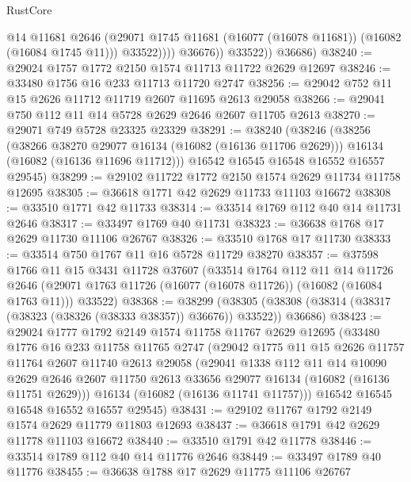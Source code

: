 \begin{lexlean}{RustCore}
\begin{coremodule}
                      @14
                      @11681
                      @2646
                      (@29071 @1745 @11681 (@16077 (@16078 @11681)) (@16082 (@16084 @1745 @11)))
                      @33522))))
              @36676))
          @33522))
      @36686)
@38240 := @29024 @1757 @1772 @2150 @1574 @11713 @11722 @2629 @12697
@38246 := @33480 @1756 @16 @233 @11713 @11720 @2747
@38256 := @29042 @752 @11 @15 @2626 @11712 @11719 @2607 @11695 @2613 @29058
@38266 := @29041 @750 @112 @11 @14 @5728 @2629 @2646 @2607 @11705 @2613
@38270 := @29071 @749 @5728 @23325 @23329
@38291 := @38240
    (@38246
      (@38256
        (@38266 @38270 @29077 @16134 (@16082 (@16136 @11706 @2629)))
        @16134
        (@16082 (@16136 @11696 @11712)))
      @16542
      @16545
      @16548
      @16552
      @16557
      @29545)
@38299 := @29102 @11722 @1772 @2150 @1574 @2629 @11734 @11758 @12695
@38305 := @36618 @1771 @42 @2629 @11733 @11103 @16672
@38308 := @33510 @1771 @42 @11733
@38314 := @33514 @1769 @112 @40 @14 @11731 @2646
@38317 := @33497 @1769 @40 @11731
@38323 := @36638 @1768 @17 @2629 @11730 @11106 @26767
@38326 := @33510 @1768 @17 @11730
@38333 := @33514 @750 @1767 @11 @16 @5728 @11729 @38270
@38357 := @37598
    @1766
    @11
    @15
    @3431
    @11728
    @37607
    (@33514
      @1764
      @112
      @11
      @14
      @11726
      @2646
      (@29071 @1763 @11726 (@16077 (@16078 @11726)) (@16082 (@16084 @1763 @11)))
      @33522)
@38368 := @38299
    (@38305 (@38308 (@38314 (@38317 (@38323 (@38326 (@38333 @38357)) @36676)) @33522)) @36686)
@38423 := @29024
    @1777
    @1792
    @2149
    @1574
    @11758
    @11767
    @2629
    @12695
    (@33480
      @1776
      @16
      @233
      @11758
      @11765
      @2747
      (@29042
        @1775
        @11
        @15
        @2626
        @11757
        @11764
        @2607
        @11740
        @2613
        @29058
        (@29041
          @1338
          @112
          @11
          @14
          @10090
          @2629
          @2646
          @2607
          @11750
          @2613
          @33656
          @29077
          @16134
          (@16082 (@16136 @11751 @2629)))
        @16134
        (@16082 (@16136 @11741 @11757)))
      @16542
      @16545
      @16548
      @16552
      @16557
      @29545)
@38431 := @29102 @11767 @1792 @2149 @1574 @2629 @11779 @11803 @12693
@38437 := @36618 @1791 @42 @2629 @11778 @11103 @16672
@38440 := @33510 @1791 @42 @11778
@38446 := @33514 @1789 @112 @40 @14 @11776 @2646
@38449 := @33497 @1789 @40 @11776
@38455 := @36638 @1788 @17 @2629 @11775 @11106 @26767

\end{coremodule}
\end{lexlean}
